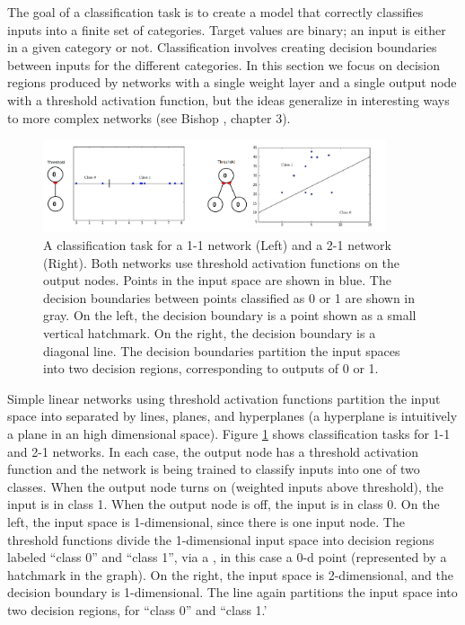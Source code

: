 The goal of a classification task is to create a model that correctly classifies inputs into a finite set of categories. Target values are binary; an input is either in a given category or not. Classification involves creating decision boundaries between inputs for the different categories. In this section we focus on decision regions produced by networks with a single weight layer and a single output node with a threshold activation function, but the ideas generalize in interesting ways to more complex networks (see Bishop \cite{bishop1995neural}, chapter 3).

\begin{figure}[h]
\centering
\includegraphics[width=0.9\textwidth]{images/visualizeClassification.png}
\caption[Jeff Yoshimi.]{A classification task for a 1-1 network (Left) and a 2-1 network (Right). Both networks use threshold activation functions on the output nodes. Points in the input space are shown in  blue. The decision boundaries between points classified as 0 or 1 are shown in gray. On the left, the decision boundary is a point shown as a small vertical hatchmark. On the right, the decision boundary is a diagonal line. The decision boundaries partition the input spaces into two decision regions, corresponding to outputs of 0 or 1.}
\label{visualize_classification}
\end{figure}

Simple linear networks using threshold activation functions partition the input space into  separated by lines, planes, and hyperplanes (a hyperplane is intuitively a plane in an high dimensional space). Figure \ref{visualize_classification} shows classification tasks for 1-1 and 2-1 networks. In each case, the output node has a threshold activation function and the network is being trained to classify inputs into one of two classes. When the output node turns on (weighted inputs above threshold), the input is in class 1. When the output node is off, the input is in class 0. On the left, the input space is 1-dimensional, since there is one input node. The threshold functions divide the 1-dimensional input space into decision regions  labeled ``class 0'' and ``class 1'', via a , in this case a 0-d point (represented by a hatchmark in the graph). On the right, the input space is 2-dimensional, and the decision boundary is 1-dimensional. The line again partitions the input space into two decision regions, for ``class 0'' and ``class 1.'

